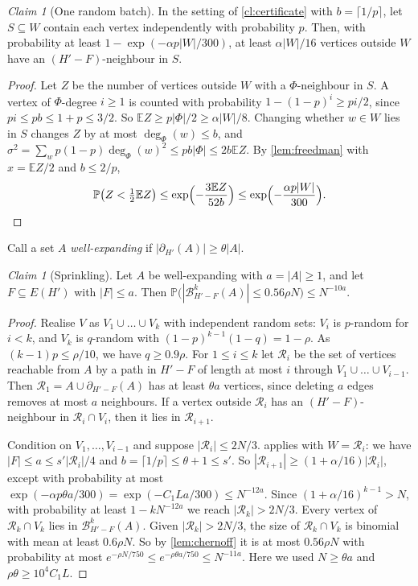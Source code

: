 \documentclass[11pt]{article}
\theoremstyle{definition}
\theoremstyle{remark}
\newtheorem{aclaim}[theorem]{Claim}
\numberwithin{equation}{section}
\numberwithin{figure}{section}
\numberwithin{table}{section}
\newcommand{\E}{\mathbb{E}}
\renewcommand{\Pr}{\mathbb{P}}
\newcommand{\NN}{\partial}
\newcommand{\cB}{\mathcal{B}}
\newcommand{\cR}{\mathcal{R}}
\begin{document}
\begin{aclaim}[One random batch]\label{cl:batch}
In the setting of \cref{cl:certificate} with $b=\lceil1/p\rceil$, let
$S\subseteq W$ contain each vertex independently with probability $p$. Then,
with probability at least $1-\exp(-\alpha p|W|/300)$, at least $\alpha|W|/16$
vertices outside $W$ have an $(H'-F)$-neighbour in $S$.
\end{aclaim}

\begin{proof}
Let $Z$ be the number of vertices outside $W$ with a $\Phi$-neighbour in $S$. A
vertex of $\Phi$-degree $i\ge1$ is counted with probability
$1-(1-p)^i\ge pi/2$, since $pi\le pb\le1+p\le3/2$. So
$\E Z\ge p|\Phi|/2\ge\alpha|W|/8$. Changing whether $w\in W$ lies in $S$
changes $Z$ by at most $\deg_\Phi(w)\le b$, and
$\sigma^2=\sum_wp(1-p)\deg_\Phi(w)^2\le pb|\Phi|\le2b\E Z$. By
\cref{lem:freedman} with $x=\E Z/2$ and $b\le2/p$,
\[
\Pr\bigl(Z<\tfrac12\E Z\bigr)\le\exp\Bigl(-\frac{3\E Z}{52b}\Bigr)
\le\exp\Bigl(-\frac{\alpha p|W|}{300}\Bigr).\qedhere
\]
\end{proof}

Call a set $A$ \emph{well-expanding} if $|\NN_{H'}(A)|\ge\theta|A|$.

\begin{aclaim}[Sprinkling]\label{cl:sprinkle}
Let $A$ be well-expanding with $a=|A|\ge1$, and let $F\subseteq E(H')$ with
$|F|\le a$. Then
$\Pr\bigl(|\cB^k_{H'-F}(A)|\le0.56\rho N\bigr)\le N^{-10a}$.
\end{aclaim}

\begin{proof}
Realise $V$ as $V_1\cup\dots\cup V_k$ with independent random sets: $V_i$ is
$p$-random for $i<k$, and $V_k$ is $q$-random with
$(1-p)^{k-1}(1-q)=1-\rho$. As $(k-1)p\le\rho/10$, we have $q\ge0.9\rho$. For
$1\le i\le k$ let $\cR_i$ be the set of vertices reachable from $A$ by a path in
$H'-F$ of length at most $i$ through $V_1\cup\dots\cup V_{i-1}$. Then
$\cR_1=A\cup\NN_{H'-F}(A)$ has at least $\theta a$ vertices, since deleting $a$
edges removes at most $a$ neighbours. If a vertex outside $\cR_i$ has an
$(H'-F)$-neighbour in $\cR_i\cap V_i$, then it lies in $\cR_{i+1}$.

Condition on $V_1,\dots,V_{i-1}$ and suppose $|\cR_i|\le2N/3$. 
applies with $W=\cR_i$: we have $|F|\le a\le s'|\cR_i|/4$ and
$b=\lceil1/p\rceil\le\theta+1\le s'$. So $|\cR_{i+1}|\ge(1+\alpha/16)|\cR_i|$,
except with probability at most
$\exp(-\alpha p\theta a/300)=\exp(-C_1La/300)\le N^{-12a}$. Since
$(1+\alpha/16)^{k-1}>N$, with probability at least $1-kN^{-12a}$ we reach
$|\cR_k|>2N/3$. Every vertex of $\cR_k\cap V_k$ lies in $\cB^k_{H'-F}(A)$.
Given $|\cR_k|>2N/3$, the size of $\cR_k\cap V_k$ is binomial with mean at least
$0.6\rho N$. So by \cref{lem:chernoff} it is at most $0.56\rho N$ with
probability at most $e^{-\rho N/750}\le e^{-\rho\theta a/750}\le N^{-11a}$.
Here we used $N\ge\theta a$ and $\rho\theta\ge10^4C_1L$.
\end{proof}
\end{document}
